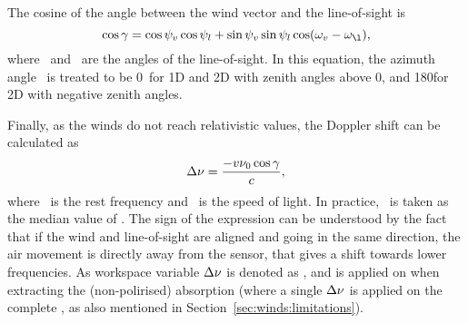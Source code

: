 The cosine of the angle between the wind vector and the line-of-sight is
\begin{equation}
  \cos\gamma = \cos\aZntAng{\Wind}\cos\aZntAng{l} + 
               \sin\aZntAng{\Wind}\sin\aZntAng{l}
               \cos(\aAzmAng{\Wind}-\aAzmAng{\l}),
  \label{eq:winds:dang}
\end{equation}
where \ and \ are the angles of the line-of-sight. In
this equation, the azimuth angle \ is treated to be 0\degree\ for 1D
and 2D with zenith angles above 0, and 180\degree for 2D with negative zenith
angles.

Finally, as the winds do not reach relativistic values, the Doppler shift can
be calculated as
\begin{equation}
  \Delta\nu = \frac{-v\nu_{0}\cos\gamma}{c},
  \label{eq:winds:aa}
\end{equation}
where \ is the rest frequency and \speedoflight\ is the speed of light.
In practice, \ is taken as the median value of .
The sign of the expression can be understood by the fact that if the wind and
line-of-sight are aligned and going in the same direction, the air movement is
directly away from the sensor, that gives a shift towards lower frequencies. As
workspace variable $\Delta\nu$ is denoted as , and is
applied on  when extracting the (non-polirised) absorption
(where a single $\Delta\nu$ is applied on the complete , as
also mentioned in Section~\ref{sec:winds:limitations}).

